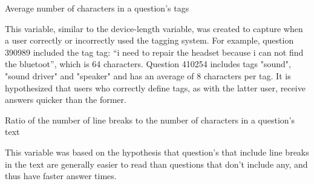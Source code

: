 \documentclass{article}
\begin{document}
Average number of characters in a question's tags

This variable, similar to the device-length variable, was created to capture when a user correctly or incorrectly used the tagging system. For example, question 390989 included the tag tag: “i need to repair the headset because i can not find the bluetoot”, which is 64 characters. Question 410254 includes tags "sound", "sound driver" and "speaker" and has an average of 8 characters per tag. It is hypothesized that users who correctly define tags, as with the latter user, receive answers quicker than the former. 

Ratio of the number of line breaks to the number of characters in a question's text

This variable was based on the hypothesis that question's that include line breaks in the text are generally easier to read than questions that don't include any, and thus have faster answer times. 



\end{document}
